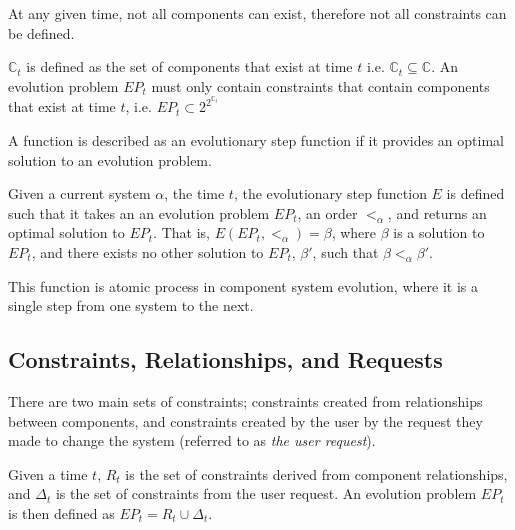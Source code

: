 At any given time, not all components can exist, therefore not all constraints can be defined.
\begin{defs}
$\mathbb{C}_t$ is defined as the set of components that exist at time $t$ i.e. $\mathbb{C}_t \subseteq \mathbb{C}$.
An evolution problem $EP_t$ must only contain constraints that contain components that exist at time $t$, i.e. $EP_t \subset 2^{2^{\mathbb{C}_t}}$ 
\end{defs}

A function is described as an evolutionary step function if it provides an optimal solution to an evolution problem.
\begin{defs}
Given a current system $\alpha$, the time $t$,
the evolutionary step function $E$ is defined such that it takes an an evolution problem $EP_t$, an order $<_{\alpha}$, 
and returns an optimal solution to $EP_t$.
That is, $E(EP_t,<_{\alpha}) = \beta$, 
where $\beta$ is a solution to $EP_t$, and there exists no other solution to $EP_t$, $\beta'$, 
such that $\beta <_{\alpha} \beta'$.
\end{defs}

This function is atomic process in component system evolution, where it is a single step from one system to the next.

\subsection{Constraints, Relationships, and Requests}
\label{formal.constraints}
There are two main sets of constraints; constraints created from relationships between components, 
and constraints created by the user by the request they made to change the system (referred to as \textit{the user request}).
\begin{defs}
Given a time $t$, $R_t$ is the set of constraints derived from component relationships, and $\Delta_t$ is the set of constraints from the user request.
An evolution problem $EP_t$ is then defined as $EP_t = R_t \cup \Delta_t$.
\end{defs}

